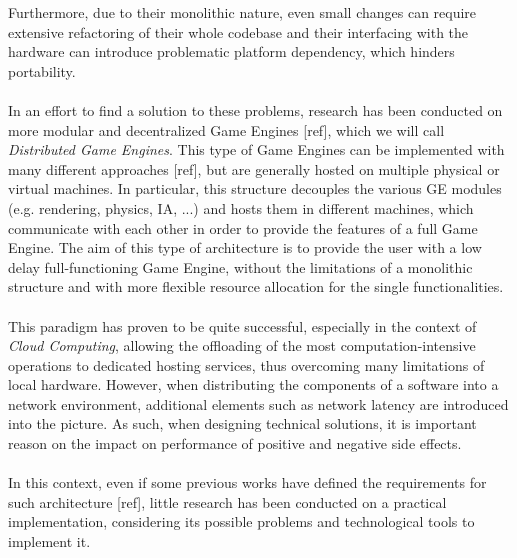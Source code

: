 Furthermore, due to their monolithic nature, even small changes can require extensive refactoring of their whole codebase and their interfacing with the hardware can introduce problematic platform dependency, which hinders portability. \\ \\
In an effort to find a solution to these problems, research has been conducted on more modular and decentralized Game Engines [ref], which we will call \textit{Distributed Game Engines}. This type of Game Engines can be implemented with many different approaches [ref], but are generally hosted on multiple physical or virtual machines. In particular, this structure decouples the various GE modules (e.g. rendering, physics, IA, ...) and hosts them in different machines, which communicate with each other in order to provide the features of a full Game Engine. The aim of this type of architecture is to provide the user with a low delay full-functioning Game Engine, without the limitations of a monolithic structure and with more flexible resource allocation for the single functionalities. \\ \\
This paradigm has proven to be quite successful, especially in the context of \textit{Cloud Computing}, allowing the offloading of the most computation-intensive operations to dedicated hosting services, thus overcoming many limitations of local hardware. However, when distributing the components of a software into a network environment, additional elements such as network latency are introduced into the picture. As such, when designing technical solutions, it is important reason on the impact on performance of positive and negative side effects. \\ \\
In this context, even if some previous works have defined the requirements for such architecture [ref], little research has been conducted on a practical implementation, considering its possible problems and technological tools to implement it.

